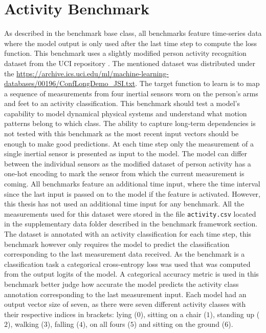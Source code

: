 \documentclass[draft,final]{vutinfth} %
\begin{document}
    \section{Activity Benchmark} \label{activity}
    As described in the benchmark base class, all benchmarks feature time-series data where the model output is only used after the last time step to compute the loss function.
    This benchmark uses a slightly modified person activity recognition dataset from the UCI repository \cite{UCI}.
    The mentioned dataset was distributed under the \url{https://archive.ics.uci.edu/ml/machine-learning-databases/00196/ConfLongDemo_JSI.txt}.
    The target function to learn is to map a sequence of measurements from four inertial sensors worn on the person's arms and feet to an activity classification.
    This benchmark should test a model's capability to model dynamical physical systems and understand what motion patterns belong to which class.
    The ability to capture long-term dependencies is not tested with this benchmark as the most recent input vectors should be enough to make good predictions.
    At each time step only the measurement of a single inertial sensor is presented as input to the model.
    The model can differ between the individual sensors as the modified dataset of person activity has a one-hot encoding to mark the sensor from which the current measurement is coming.
    All benchmarks feature an additional time input, where the time interval since the last input is passed on to the model if the feature is activated.
    However, this thesis has not used an additional time input for any benchmark.
    All the measurements used for this dataset were stored in the file \texttt{activity.csv} located in the supplementary data folder described in the benchmark framework section.
    The dataset is annotated with an activity classification for each time step, this benchmark however only requires the model to predict the classification corresponding to the last measurement data received.
    As the benchmark is a classification task a categorical cross-entropy loss was used that was computed from the output logits of the model.
    A categorical accuracy metric is used in this benchmark better judge how accurate the model predicts the activity class annotation corresponding to the last measurement input.
    Each model had an output vector size of seven, as there were seven different activity classes with their respective indices in brackets: lying ($0$), sitting on a chair ($1$), standing up ($2$), walking ($3$), falling ($4$), on all fours ($5$) and sitting on the ground ($6$).
\end{document}
